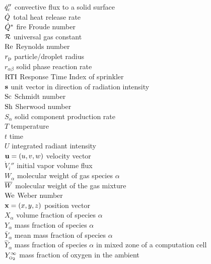 \begin{tabbing}
$\dot{q}_{\rm c}''$           \> convective flux to a solid surface \\
$\dot{Q}$                     \> total heat release rate \\
$\dot{Q}^*$                   \> fire Froude number \\
${\cal R}$                      \> universal gas constant \\
$\hbox{Re}$                     \> Reynolds number \\
$r_{\rm p}$               \> particle/droplet radius \\
$r_{\alpha\beta}$         \> solid phase reaction rate \\
$\hbox{RTI}$              \> Response Time Index of sprinkler \\
${\bf s}$                     \> unit vector in direction of radiation intensity\\
$\hbox{Sc}$                     \> Schmidt number \\
$\hbox{Sh}$                     \> Sherwood number \\
$S_\alpha$                \> solid component production rate \\
$T$                       \> temperature \\
$t$                       \> time           \\
$U$                       \> integrated radiant intensity \\
${\bf u}=(u,v,w)$             \> velocity vector  \\
$\dot{V}_i''$             \> initial vapor volume flux \\
$W_\alpha$                \> molecular weight of gas species $\alpha$ \\
$\overline{W}$                     \> molecular weight of the gas mixture \\
$\hbox{We}$                     \> Weber number \\
${\bf x}=(x,y,z)$             \> position vector  \\
$X_\alpha$                \> volume fraction of species $\alpha$   \\
$Y_\alpha$                \> mass fraction of species $\alpha$   \\
$\bar{Y}_\alpha$          \> mean mass fraction of species $\alpha$   \\
$\hat{Y}_\alpha$          \> mass fraction of species $\alpha$ in mixed zone of a computation cell \\
$Y_{\tiny \hbox{O}_2}^\infty$          \> mass fraction of oxygen in the ambient   \\

\end{tabbing}
